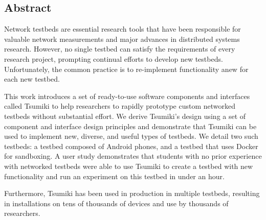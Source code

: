 \subsection*{Abstract}

Network testbeds are essential research tools that have been
responsible for valuable network measurements and major advances in 
distributed systems research.  However, no single testbed can satisfy 
the requirements of every research project, prompting continual efforts 
to develop new testbeds.
%
Unfortunately, the common
practice is to re-implement functionality anew for each new testbed.

This work introduces a set of ready-to-use software components and
interfaces called Tsumiki to help researchers to rapidly prototype
custom networked testbeds without substantial effort.
%
We derive Tsumiki's design using a set of component and interface
design principles and demonstrate that Tsumiki can be used to
implement new, diverse, and useful types of testbeds. We detail
two such testbeds: a testbed composed of Android phones, and a testbed
that uses Docker for sandboxing.
%
%
%
A user study demonstrates that students with no prior experience with
networked testbeds were able to use Tsumiki to create a testbed with
new functionality and run an experiment on this testbed in under an
hour.

Furthermore, Tsumiki has been used in production
in multiple testbeds, resulting in installations on tens of thousands of 
devices and use by thousands of researchers.



